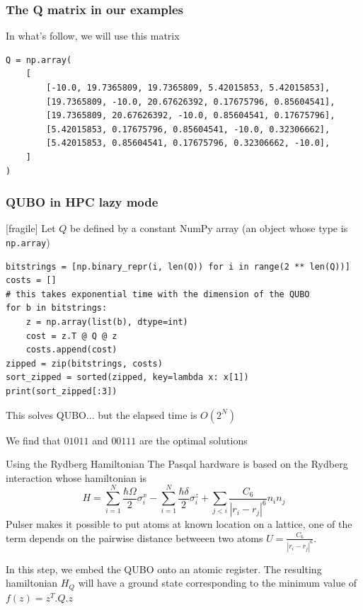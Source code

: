 \begin{frame}[fragile]
\frametitle{The Q matrix in our examples}
In what's follow, we will use this matrix
\begin{verbatim}
Q = np.array(
    [
        [-10.0, 19.7365809, 19.7365809, 5.42015853, 5.42015853],
        [19.7365809, -10.0, 20.67626392, 0.17675796, 0.85604541],
        [19.7365809, 20.67626392, -10.0, 0.85604541, 0.17675796],
        [5.42015853, 0.17675796, 0.85604541, -10.0, 0.32306662],
        [5.42015853, 0.85604541, 0.17675796, 0.32306662, -10.0],
    ]
)
\end{verbatim}
\end{frame}


\begin{frame}[fragile]
\frametitle{QUBO in HPC lazy mode}[fragile]
Let $Q$ be defined by a constant NumPy array (an object whose type is \texttt{np.array})
\begin{verbatim}
bitstrings = [np.binary_repr(i, len(Q)) for i in range(2 ** len(Q))]
costs = []
# this takes exponential time with the dimension of the QUBO
for b in bitstrings:
    z = np.array(list(b), dtype=int)
    cost = z.T @ Q @ z
    costs.append(cost)
zipped = zip(bitstrings, costs)
sort_zipped = sorted(zipped, key=lambda x: x[1])
print(sort_zipped[:3])    
\end{verbatim}

This solves QUBO... but the elapsed time is $O(2^N)$

We find that $01011$ and $00111$ are the optimal solutions
\end{frame}


\begin{frame}{Using the Rydberg Hamiltonian}
The Pasqal hardware is based on the Rydberg interaction whose hamiltonian is 
\begin{equation*}
    H = \sum_{i=1}^N \frac{\hbar\Omega}{2}\sigma_i^x - \sum_{i=1}^N \frac{\hbar\delta}{2}\sigma_i^z +
        \sum_{j < i}\frac{C_6}{|r_i - r_j|^6}n_i n_j
\end{equation*}
Pulser makes it possible to put atoms at known location on a lattice, one of the term depends on the pairwise distance 
betweeen two atoms $U = \frac{C_6}{|r_i - r_j|^6}$. 
\newline

In this step, we embed the QUBO onto an atomic register. The resulting hamiltonian $H_Q$ will have a ground state
corresponding to the minimum value of $f(z) = z^T.Q.z$ 
\end{frame}

